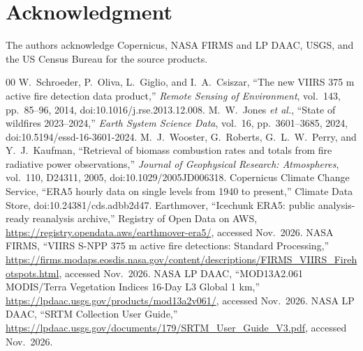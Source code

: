 \documentclass[conference]{IEEEtran}
\begin{document}
\section*{Acknowledgment}
The authors acknowledge Copernicus, NASA FIRMS and LP DAAC, USGS, and the US Census Bureau for the source products.
\begin{thebibliography}{00}
 W.~Schroeder, P.~Oliva, L.~Giglio, and I.~A.~Csiszar, ``The new VIIRS 375 m active fire detection data product,'' \emph{Remote Sensing of Environment}, vol.~143, pp.~85--96, 2014, doi:10.1016/j.rse.2013.12.008.
 M.~W.~Jones \emph{et al.}, ``State of wildfires 2023--2024,'' \emph{Earth System Science Data}, vol.~16, pp.~3601--3685, 2024, doi:10.5194/essd-16-3601-2024.
 M.~J.~Wooster, G.~Roberts, G.~L.~W.~Perry, and Y.~J.~Kaufman, ``Retrieval of biomass combustion rates and totals from fire radiative power observations,'' \emph{Journal of Geophysical Research: Atmospheres}, vol.~110, D24311, 2005, doi:10.1029/2005JD006318.
 Copernicus Climate Change Service, ``ERA5 hourly data on single levels from 1940 to present,'' Climate Data Store, doi:10.24381/cds.adbb2d47.
 Earthmover, ``Icechunk ERA5: public analysis-ready reanalysis archive,'' Registry of Open Data on AWS, \url{https://registry.opendata.aws/earthmover-era5/}, accessed Nov.~2026.
 NASA FIRMS, ``VIIRS S-NPP 375 m active fire detections: Standard Processing,'' \url{https://firms.modaps.eosdis.nasa.gov/content/descriptions/FIRMS_VIIRS_Firehotspots.html}, accessed Nov.~2026.
 NASA LP DAAC, ``MOD13A2.061 MODIS/Terra Vegetation Indices 16-Day L3 Global 1 km,'' \url{https://lpdaac.usgs.gov/products/mod13a2v061/}, accessed Nov.~2026.
 NASA LP DAAC, ``SRTM Collection User Guide,'' \url{https://lpdaac.usgs.gov/documents/179/SRTM_User_Guide_V3.pdf}, accessed Nov.~2026.
\end{thebibliography}
\end{document}
